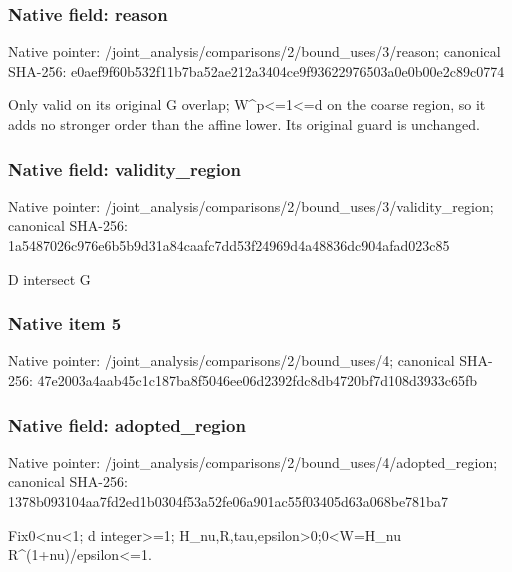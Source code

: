 \documentclass[10pt,a4paper]{article}
\begin{document}
\subsubsection{Native field: reason}
Native pointer: /joint\_\allowbreak{}analysis/comparisons/2/bound\_\allowbreak{}uses/3/reason; canonical SHA-256: e0aef9f60b532f11b7ba52ae212a3404ce9f93622976503a0e0b00e2c89c0774

\begingroup\raggedright\sloppy Only valid on its original G overlap;\allowbreak{} W\textasciicircum{}p<=\allowbreak{}1<=\allowbreak{}d on the coarse region,\allowbreak{} so it adds no stronger order than the affine lower. Its original guard is unchanged.\par\endgroup

\subsubsection{Native field: validity\_\allowbreak{}region}
Native pointer: /joint\_\allowbreak{}analysis/comparisons/2/bound\_\allowbreak{}uses/3/validity\_\allowbreak{}region; canonical SHA-256: 1a5487026c976e6b5b9d31a84caafc7dd53f24969d4a48836dc904afad023c85

\begingroup\raggedright\sloppy D intersect G\par\endgroup

\subsubsection{Native item 5}
Native pointer: /joint\_\allowbreak{}analysis/comparisons/2/bound\_\allowbreak{}uses/4; canonical SHA-256: 47e2003a4aab45c1c187ba8f5046ee06d2392fdc8db4720bf7d108d3933c65fb

\subsubsection{Native field: adopted\_\allowbreak{}region}
Native pointer: /joint\_\allowbreak{}analysis/comparisons/2/bound\_\allowbreak{}uses/4/adopted\_\allowbreak{}region; canonical SHA-256: 1378b093104aa7fd2ed1b0304f53a52fe06a901ac55f03405d63a068be781ba7

\begingroup\raggedright\sloppy Fix0<nu<1;\allowbreak{} d integer>=\allowbreak{}1;\allowbreak{} H\_\allowbreak{}nu,\allowbreak{}R,\allowbreak{}tau,\allowbreak{}epsilon>0;\allowbreak{}0<W=\allowbreak{}H\_\allowbreak{}nu R\textasciicircum{}(1+nu)/\allowbreak{}epsilon<=\allowbreak{}1.\par\endgroup
\end{document}
